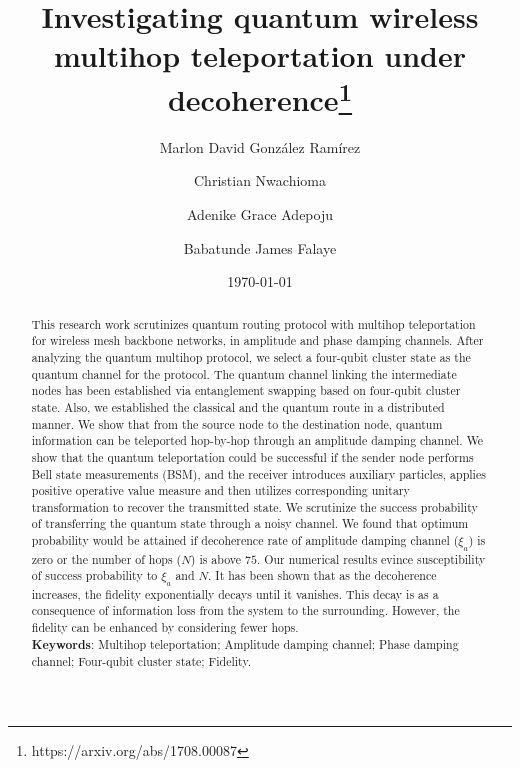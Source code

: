 \documentclass[aps,pra,twocolumn,showpacs,superscriptaddress,groupedaddress]{revtex4}
\begin{document}
\title{Investigating quantum wireless multihop teleportation under decoherence\footnote{https://arxiv.org/abs/1708.00087}}
\author{Marlon David Gonz\'alez Ram\'irez}
\author{Christian Nwachioma}
\author{Adenike Grace Adepoju}
\author{Babatunde James Falaye}
\date{\today}


\begin{abstract}
This research work scrutinizes quantum routing protocol with multihop teleportation for wireless mesh backbone networks, in amplitude and phase damping channels. After analyzing the quantum multihop protocol, we select a four-qubit cluster state as the quantum channel for the protocol. The quantum channel linking the intermediate nodes has been established via entanglement swapping based on four-qubit cluster state. Also, we established the classical and the quantum route in a distributed manner. We show that from the source node to the destination node, quantum information can be teleported hop-by-hop through an amplitude damping channel. We show that the quantum teleportation could be successful if the sender node performs Bell state measurements (BSM), and the receiver introduces auxiliary particles, applies positive operative value measure and then utilizes corresponding unitary transformation to recover the transmitted state. We scrutinize the success probability of transferring the quantum state through a noisy channel. We found that optimum probability would be attained if decoherence rate of amplitude damping channel ($\xi_a$) is zero or the number of hops ($N$) is above $75$. Our numerical results evince susceptibility of success probability to $\xi_a$ and $N$. It has been shown that as the decoherence increases, the fidelity exponentially decays until it vanishes. This decay is as a consequence of information loss from the system to the surrounding. However, the fidelity can be enhanced by considering fewer hops.\vspace{5mm}\\
{\bf Keywords}:  Multihop teleportation; Amplitude damping channel; Phase damping channel; Four-qubit cluster state; Fidelity.
\end{abstract}
\maketitle
\end{document}
